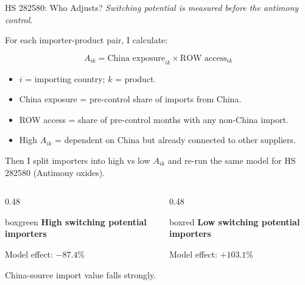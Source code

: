 \documentclass[aspectratio=169,11pt]{beamer}
\begin{document}
\begin{frame}{HS 282580: Who Adjusts?}
  \scriptsize
  \textit{Switching potential is measured before the antimony control.}

  \vspace{-0.04cm}
  For each importer-product pair, I calculate:

  \vspace{-0.22cm}
  \[
  A_{ik}=\text{China exposure}_{ik}\times \text{ROW access}_{ik}
  \]

  \vspace{-0.30cm}
  \scriptsize
  \begin{itemize}
    \item \(i\) = importing country; \(k\) = product.
    \item China exposure = pre-control share of imports from China.
    \item ROW access = share of pre-control months with any non-China import.
    \item High \(A_{ik}\) = dependent on China but already connected to other suppliers.
  \end{itemize}

  \vspace{0.04cm}
  Then I split importers into high vs low \(A_{ik}\) and re-run the same model for HS 282580 (Antimony oxides).

  \vspace{0.08cm}
  \begin{columns}[T,totalwidth=\textwidth]
    \begin{column}{0.48\textwidth}
      \begin{beamercolorbox}[rounded=true,sep=0.42em,wd=\textwidth]{boxgreen}
        \small\textbf{High switching potential importers}

        \vspace{0.04cm}
        {\Large Model effect: \(-87.4\%\)}

        \vspace{0.04cm}
        \scriptsize China-source import value falls strongly.
      \end{beamercolorbox}
    \end{column}
    \begin{column}{0.48\textwidth}
      \begin{beamercolorbox}[rounded=true,sep=0.42em,wd=\textwidth]{boxred}
        \small\textbf{Low switching potential importers}

        \vspace{0.04cm}
        {\Large Model effect: \(+103.1\%\)}


\end{beamercolorbox}
\end{column}
\end{columns}
\end{frame}
\end{document}

